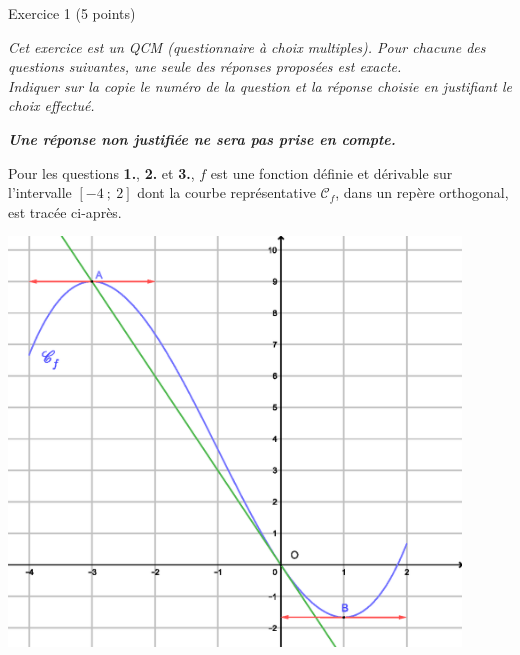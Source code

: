 
%
\begin{h2}Exercice 1 (5 points)\end{h2}
\par
\emph{Cet exercice est un QCM (questionnaire à choix multiples). Pour chacune des questions suivantes, une seule des réponses proposées est exacte. \\Indiquer sur la copie le numéro de la question et la réponse choisie en justifiant le choix effectué. }
\par
\medskip
\par
\emph{\textbf{Une réponse non justifiée ne sera pas prise en compte.}}
\par
Pour les questions \textbf{1.}, \textbf{2.} et \textbf{3.}, $f$ est une fonction définie et dérivable sur l'intervalle $[-4~;~2]$ dont la courbe représentative $\mathscr{C}_{f}$, dans un repère orthogonal, est tracée ci-après.
\par
\begin{center}
     \begin{extern}%

\begin{center}
\end{center}
          \includegraphics[width=0.9\textwidth]{images/BBESL-s1-1-1}%
     \end{extern}
\end{center}
